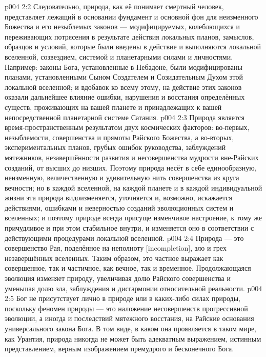 \vs p004 2:2 Следовательно, природа, как её понимает смертный человек, представляет лежащий в основании фундамент и основной фон для неизменного Божества и его незыблемых законов --- модифицируемых, колеблющихся и переживающих потрясения в результате действия локальных планов, замыслов, образцов и условий, которые были введены в действие и выполняются локальной вселенной, созвездием, системой и планетарными силами и личностями. Например: законы Бога, установленные в Небадоне, были модифицированы планами, установленными Сыном Создателем и Созидательным Духом этой локальной вселенной; и вдобавок ко всему этому, на действие этих законов оказали дальнейшее влияние ошибки, нарушения и восстания определённых существ, проживающих на вашей планете и принадлежащих к вашей непосредственной планетарной системе Сатания.
\vs p004 2:3 \pc Природа является время\hyp{}пространственным результатом двух космических факторов: во\hyp{}первых, незыблемости, совершенства и прямоты Райского Божества, а во\hyp{}вторых, экспериментальных планов, грубых ошибок руководства, заблуждений мятежников, незавершённости развития и несовершенства мудрости вне\hyp{}Райских созданий, от высших до низших. Поэтому природа несёт в себе единообразную, неизменную, величественную и удивительную нить совершенства из круга вечности; но в каждой вселенной, на каждой планете и в каждой индивидуальной жизни эта природа видоизменяется, уточняется и, возможно, искажается действиями, ошибками и неверностью созданий эволюционных систем и вселенных; и поэтому природе всегда присуще изменчивое настроение, к тому же причудливое и при этом стабильное внутри, и изменяется оно в соответствии с действующими процедурами локальной вселенной.
\vs p004 2:4 Природа --- это совершенство Рая, поделённое на неполноту [incompletion], зло и грех незавершённых вселенных. Таким образом, это частное выражает как совершенное, так и частичное, как вечное, так и временное. Продолжающаяся эволюция изменяет природу, увеличивая долю Райского совершенства и уменьшая долю зла, заблуждения и дисгармонии относительной реальности.
\vs p004 2:5 \pc Бог не присутствует лично в природе или в каких\hyp{}либо силах природы, поскольку феномен природы --- это наложение несовершенств прогрессивной эволюции, а иногда и последствий мятежного восстания, на Райские основания универсального закона Бога. В том виде, в каком она проявляется в таком мире, как Урантия, природа никогда не может быть адекватным выражением, истинным представлением, верным изображением премудрого и бесконечного Бога.
